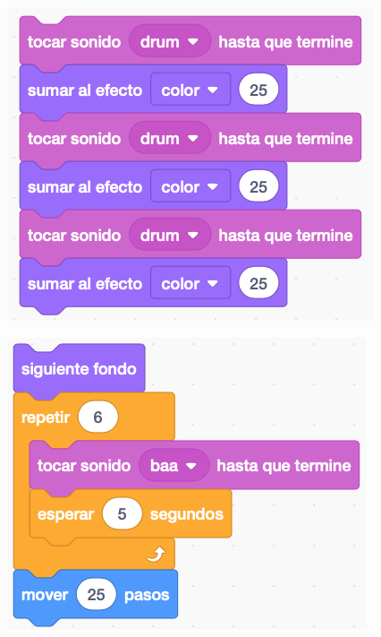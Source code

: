 \documentclass[letterpaper,12pt]{article}
\begin{document}
\includegraphics[scale=.625,valign=t]{q4_script4.png} \hspace{.01cm}

\noindent \dotfill

\begin{center}
\includegraphics[scale=.75]{q5_script0.png}
\end{center}
\end{document}
